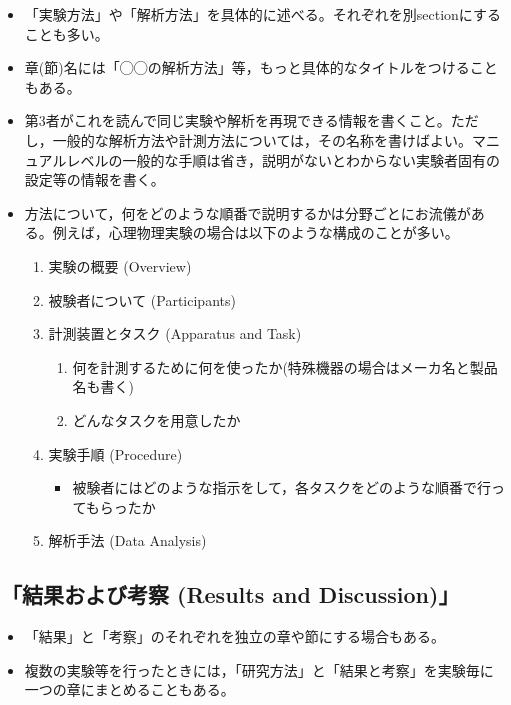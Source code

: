 \documentclass[12pt, ]{jsarticle}
\providecommand{\tightlist}{%
   \setlength{\itemsep}{0pt}\setlength{\parskip}{0pt}}
\begin{document}
\begin{itemize}
\item
  「実験方法」や「解析方法」を具体的に述べる。それぞれを別sectionにすることも多い。
\item
  章(節)名には「◯◯の解析方法」等，もっと具体的なタイトルをつけることもある。
\item
  第3者がこれを読んで同じ実験や解析を再現できる情報を書くこと。ただし，一般的な解析方法や計測方法については，その名称を書けばよい。マニュアルレベルの一般的な手順は省き，説明がないとわからない実験者固有の設定等の情報を書く。
\item
  方法について，何をどのような順番で説明するかは分野ごとにお流儀がある。例えば，心理物理実験の場合は以下のような構成のことが多い。

  \begin{enumerate}
  \tightlist
  \item
    実験の概要 (Overview)
  \item
    被験者について (Participants)
  \item
    計測装置とタスク (Apparatus and Task)

    \begin{enumerate}
    \tightlist
    \item
      何を計測するために何を使ったか(特殊機器の場合はメーカ名と製品名も書く)
    \item
      どんなタスクを用意したか
    \end{enumerate}
  \item
    実験手順 (Procedure)

    \begin{itemize}
    \tightlist
    \item
      被験者にはどのような指示をして，各タスクをどのような順番で行ってもらったか
    \end{itemize}
  \item
    解析手法 (Data Analysis)
  \end{enumerate}
\end{itemize}

\hypertarget{ux7d50ux679cux304aux3088ux3073ux8003ux5bdf-results-and-discussion}{%
\subsection{「結果および考察 (Results and
Discussion)」}\label{ux7d50ux679cux304aux3088ux3073ux8003ux5bdf-results-and-discussion}}

\begin{itemize}
\tightlist
\item
  「結果」と「考察」のそれぞれを独立の章や節にする場合もある。
\item
  複数の実験等を行ったときには，「研究方法」と「結果と考察」を実験毎に一つの章にまとめることもある。
\end{itemize}
\end{document}
